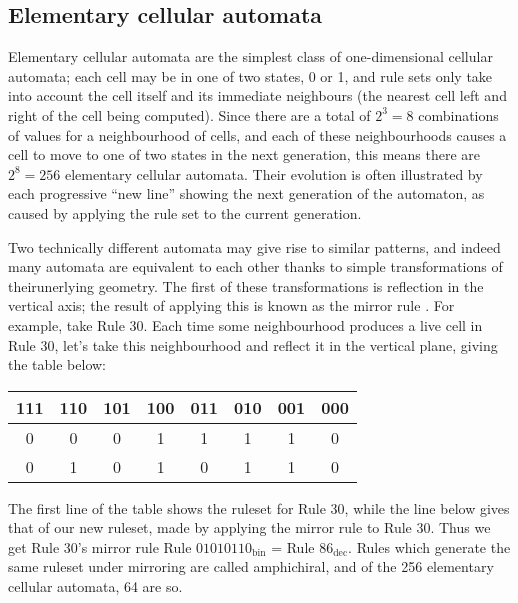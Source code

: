 \documentclass[11pt,a4paper]{article}
\begin{document}
    \subsection{Elementary cellular automata}
    Elementary cellular automata are the simplest class of one-dimensional
    cellular automata; each cell may be in one of two states, 0 or 1, and rule
    sets only take into account the cell itself and its immediate neighbours
    (the nearest cell left and right of the cell being computed). Since there
    are a total of $2^3=8$ combinations of values for a neighbourhood of cells,
    and each of these neighbourhoods causes a cell to move to one of two states
    in the next generation, this means there are $2^8=256$ elementary cellular
    automata. Their evolution is often illustrated by each progressive ``new
    line'' showing the next generation of the automaton, as caused by applying
    the rule set to the current generation.
    
    Two technically different automata may give rise to similar patterns, and
    indeed many automata are equivalent to each other thanks to simple
    transformations of theirunerlying geometry. The first of these
    transformations is reflection in the vertical axis; the result of applying
    this is known as the mirror rule \cite{elementary}. For example, take Rule
    30. Each time some neighbourhood produces a live cell in Rule 30, let's take
    this neighbourhood and reflect it in the vertical plane, giving the table
    below:

    \begin{table}[h]
        \centering
        \begin{tabular}{|c|c|c|c|c|c|c|c|}\hline
            111 & 110 & 101 & 100 & 011 & 010 & 001 & 000   \\
            \hline
            0 & 0 & 0 & 1 & 1 & 1 & 1 & 0   \\
            \hline
            0 & 1 & 0 & 1 & 0 & 1 & 1 & 0   \\
            \hline
        \end{tabular}
    \end{table}

    The first line of the table shows the ruleset for Rule 30, while the line
    below gives that of our new ruleset, made by applying the mirror rule to
    Rule 30. Thus we get Rule 30's mirror rule Rule $01010110_{\text{bin}}$ =
    Rule $86_{\text{dec}}$. Rules which generate the same ruleset under
    mirroring are called amphichiral, and of the 256 elementary cellular
    automata, 64 are so.
\end{document}
